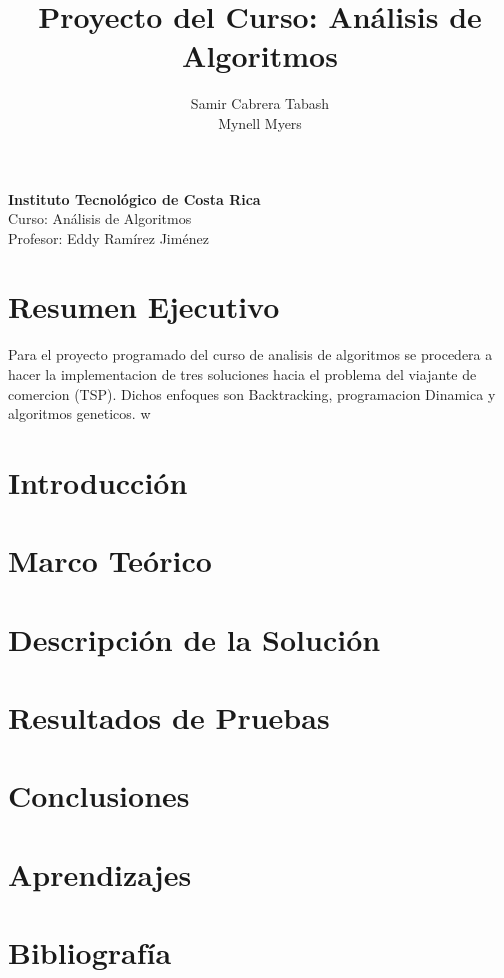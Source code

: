 \documentclass{article}
\title{Proyecto del Curso: Análisis de Algoritmos}
\author{Samir Cabrera Tabash \\ Mynell Myers}
\date{} %
\begin{document}
	
	\maketitle
	
	\begin{center}
		\textbf{Instituto Tecnológico de Costa Rica} \\
		Curso: Análisis de Algoritmos \\
		Profesor: Eddy Ramírez Jiménez
	\end{center}
	
	\newpage
	
	\section*{Resumen Ejecutivo}
	Para el proyecto programado del curso de analisis de algoritmos se procedera a hacer la implementacion de tres soluciones hacia el problema del viajante de comercion (TSP). Dichos enfoques son Backtracking, programacion Dinamica y algoritmos geneticos. w
	
	\section*{Introducción}
	
	\section*{Marco Teórico}
	
	\section*{Descripción de la Solución}
	
	\section*{Resultados de Pruebas}
	
	\section*{Conclusiones}
	
	\section*{Aprendizajes}
	
	\section*{Bibliografía}
	
\end{document}
